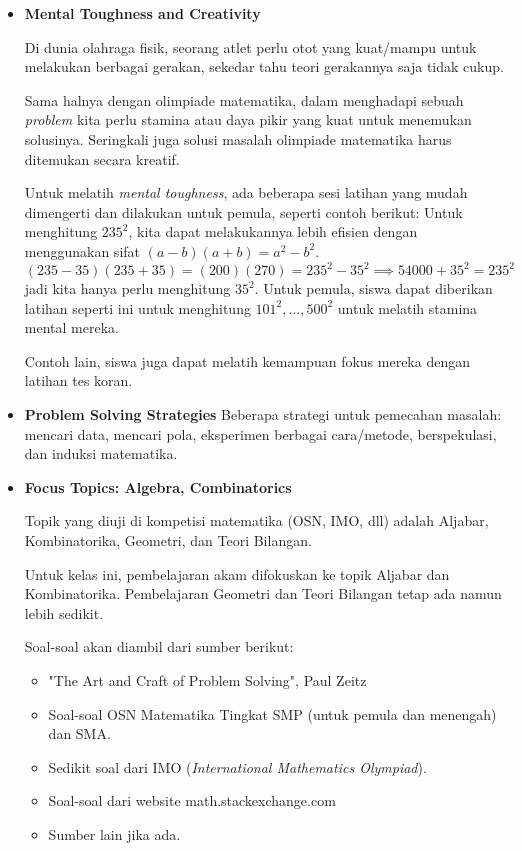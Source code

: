 \documentclass{article}
\begin{document}
\begin{itemize}

\item \textbf{Mental Toughness and Creativity}

Di dunia olahraga fisik, seorang atlet perlu otot yang kuat/mampu untuk melakukan berbagai gerakan, sekedar tahu teori gerakannya saja tidak cukup.

Sama halnya dengan olimpiade matematika, dalam menghadapi sebuah \textit{problem} kita perlu stamina atau daya pikir yang kuat untuk menemukan solusinya. Seringkali juga solusi masalah olimpiade matematika harus ditemukan secara kreatif.

Untuk melatih \textit{mental toughness}, ada beberapa sesi latihan yang mudah dimengerti dan dilakukan untuk pemula, seperti contoh berikut: Untuk menghitung $235^{2}$, kita dapat melakukannya lebih efisien dengan menggunakan sifat $(a-b)(a+b)= a^{2}-b^{2}$. 
$$(235-35)(235+35) = (200)(270) = 235^{2} - 35^{2} \implies 54000 + 35^{2} = 235^{2}$$
jadi kita hanya perlu menghitung $35^{2}$. Untuk pemula, siswa dapat diberikan latihan seperti ini untuk menghitung $101^{2}, ..., 500^{2}$ untuk melatih stamina mental mereka. 

Contoh lain, siswa juga dapat melatih kemampuan fokus mereka dengan latihan tes koran.

\item \textbf{Problem Solving Strategies}
Beberapa strategi untuk pemecahan masalah: mencari data, mencari pola, eksperimen berbagai cara/metode, berspekulasi, dan induksi matematika.


\item \textbf{Focus Topics: Algebra, Combinatorics}

Topik yang diuji di kompetisi matematika (OSN, IMO, dll) adalah Aljabar, Kombinatorika, Geometri, dan Teori Bilangan. 

Untuk kelas ini, pembelajaran akam difokuskan ke topik Aljabar dan Kombinatorika. Pembelajaran Geometri dan Teori Bilangan tetap ada namun lebih sedikit.

 Soal-soal akan diambil dari sumber berikut:

\begin{itemize}
\item "The Art and Craft of Problem Solving", Paul Zeitz
\item Soal-soal OSN Matematika Tingkat SMP (untuk pemula dan menengah) dan SMA. 
\item Sedikit soal dari IMO (\textit{International Mathematics Olympiad}).
\item Soal-soal dari website
math.stackexchange.com

\item Sumber lain jika ada.
\end{itemize}

\end{itemize}
\end{document}
